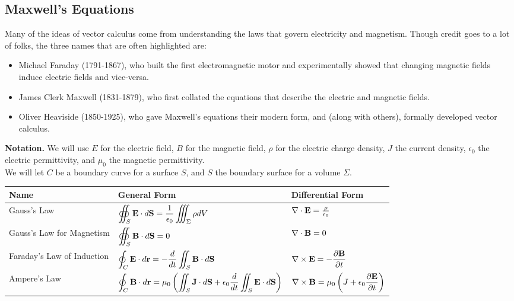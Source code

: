 \subsection{Maxwell's Equations}

Many of the ideas of vector calculus come from understanding the laws that govern electricity and magnetism. Though credit goes to a lot of folks, the three names that are often highlighted are:
\begin{itemize}
    \item Michael Faraday (1791-1867), who built the first electromagnetic motor and experimentally showed that changing magnetic fields induce electric fields and vice-versa.
    \item James Clerk Maxwell (1831-1879), who first collated the equations that describe the electric and magnetic fields.
    \item Oliver Heaviside (1850-1925), who gave Maxwell’s equations their modern form, and (along with others), formally developed vector calculus.
\end{itemize}

\newpage

\textbf{Notation.} We will use \(E\) for the electric field, \(B\) for the magnetic field, \(\rho\) for the electric charge density, \(J\) the current density, \(\epsilon_0\) the electric permittivity, and \(\mu_0\) the magnetic permittivity. \\

We will let \(C\) be a boundary curve for a surface \(S\), and \(S\) the boundary surface for a volume \(\Sigma\). \\

\begin{center}
\begin{footnotesize}
\begin{tabular}[htbp]{lll}
    \toprule
    \textbf{Name} & \textbf{General Form} & \textbf{Differential Form} \\ \midrule
    Gauss's Law & \(\displaystyle \oiint_{S} \mathbf{E} \cdot d\mathbf{S} = \frac{1}{\epsilon_{0}} \iiint_{\Sigma} \rho dV\) & \(\nabla \cdot \mathbf{E} = \frac{\rho}{\epsilon_{0}}\) \\ \midrule
    Gauss's Law for Magnetism & \(\displaystyle \oiint_{S} \mathbf{B} \cdot d\mathbf{S} = 0\) & \(\nabla \cdot \mathbf{B} = 0\) \\ \midrule
    Faraday's Law of Induction & \(\displaystyle \oint_{C} \mathbf{E} \cdot d\mathbf{r} = -\frac{d}{dt} \iint_{S} \mathbf{B} \cdot d\mathbf{S}\) & \(\displaystyle \nabla \times \mathbf{E} = -\frac{\partial \mathbf{B}}{\partial t}\) \\ \midrule
    Ampere's Law & \(\displaystyle \oint_{C} \mathbf{B} \cdot d\mathbf{r} = \mu_{0}\left(\iint_{S}\mathbf{J} \cdot d\mathbf{S} + \epsilon_{0} \frac{d}{dt} \iint_{S} \mathbf{E} \cdot d\mathbf{S}\right)\) & \(\displaystyle \nabla \times \mathbf{B} = \mu_{0} \left(J + \epsilon_{0} \frac{\partial \mathbf{E}}{\partial t}\right)\) \\ \bottomrule
\end{tabular}
\end{footnotesize}
\end{center}

